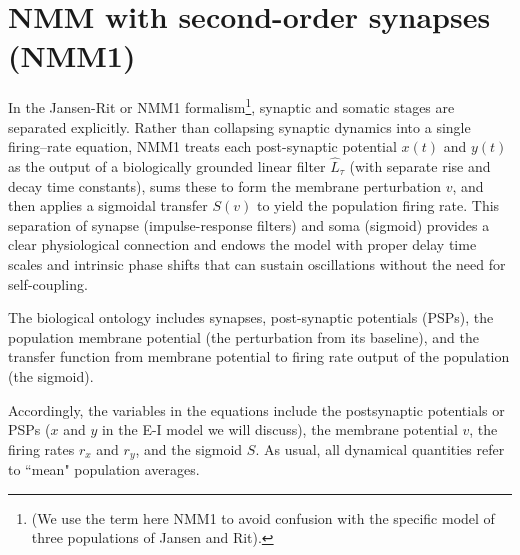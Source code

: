 \documentclass[11pt]{article}
\numberwithin{equation}{section}
\begin{document}
\section{NMM with second-order synapses (NMM1)} \label{sec:NMM1}
\begin{tcolorbox}[colback=gray!6,colframe=gray!6,enlarge left by=0mm, boxrule=0pt, enhanced, sharp corners]
In the Jansen-Rit or NMM1 formalism\footnote{(We use the term here NMM1 to avoid confusion with the specific model of three populations of Jansen and Rit).}, synaptic and somatic stages are separated explicitly.  Rather than collapsing synaptic dynamics into a single firing–rate equation, NMM1 treats each post-synaptic potential $x(t)$ and $y(t)$ as the output of a biologically grounded linear filter $\hat L_{\tau}$ (with separate rise and decay time constants), sums these to form the membrane perturbation $v$, and then applies a sigmoidal transfer $S(v)$ to yield the population firing rate.  This separation of synapse (impulse-response filters) and soma (sigmoid) provides a clear physiological connection and endows the model with proper delay time scales and intrinsic phase shifts that can sustain oscillations without the need for self-coupling.

 The biological ontology includes synapses, post-synaptic potentials (PSPs), the population membrane potential (the perturbation from its baseline), and the transfer function from membrane potential to firing rate output of the population (the sigmoid).


Accordingly, the variables in the equations include the postsynaptic potentials or PSPs ($x$ and $y$ in the E-I model we will discuss), the membrane potential $v$, the firing rates $r_x$ and $r_y$, and the sigmoid $S$.  As usual, all dynamical quantities refer to  ``mean" population averages. 
\end{tcolorbox}
\end{document}
